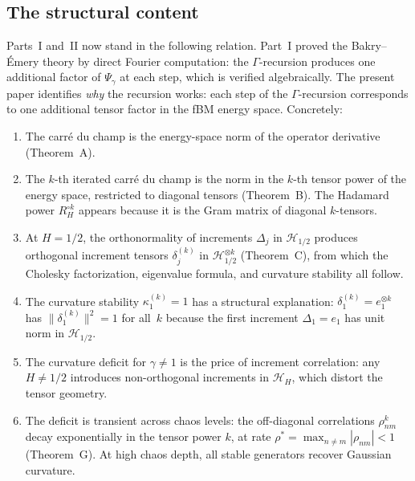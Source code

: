 \documentclass[11pt,a4paper]{article}
\theoremstyle{plain}
\theoremstyle{definition}
\theoremstyle{remark}
\newcommand{\HH}{\mathcal{H}_H}
\begin{document}
\subsection{The structural content}

Parts~I and~II now stand in the following relation.
Part~I proved the Bakry--\'Emery theory by direct
Fourier computation: the $\Gamma$-recursion produces
one additional factor of $\Psi_\gamma$ at each step,
which is verified algebraically.  The present paper
identifies \emph{why} the recursion works: each step
of the $\Gamma$-recursion corresponds to one additional
tensor factor in the fBM energy space.  Concretely:

\begin{enumerate}[label=(\alph*)]
\item The carr\'e du champ is the energy-space norm of
  the operator derivative (Theorem~A).

\item The $k$-th iterated carr\'e du champ is the
  norm in the $k$-th tensor power of the energy space,
  restricted to diagonal tensors (Theorem~B).
  The Hadamard power $R_H^{\circ k}$ appears because
  it is the Gram matrix of diagonal $k$-tensors.

\item At $H = 1/2$, the orthonormality of increments
  $\Delta_j$ in $\mathcal{H}_{1/2}$ produces
  orthogonal increment tensors $\delta_j^{(k)}$ in
  $\mathcal{H}_{1/2}^{\otimes k}$ (Theorem~C),
  from which the Cholesky factorization, eigenvalue
  formula, and curvature stability all follow.

\item The curvature stability $\kappa_1^{(k)} = 1$
  has a structural explanation:
  $\delta_1^{(k)} = e_1^{\otimes k}$ has
  $\|\delta_1^{(k)}\|^2 = 1$ for all~$k$
  because the first increment $\Delta_1 = e_1$ has
  unit norm in $\mathcal{H}_{1/2}$.

\item The curvature deficit for $\gamma \neq 1$ is
  the price of increment correlation: any
  $H \neq 1/2$ introduces non-orthogonal increments
  in $\HH$, which distort the tensor geometry.

\item The deficit is transient across chaos levels:
  the off-diagonal correlations $\rho_{nm}^k$ decay
  exponentially in the tensor power $k$, at rate
  $\rho^* = \max_{n \neq m}|\rho_{nm}| < 1$
  (Theorem~G).  At high chaos depth, all stable
  generators recover Gaussian curvature.
\end{enumerate}
\end{document}
